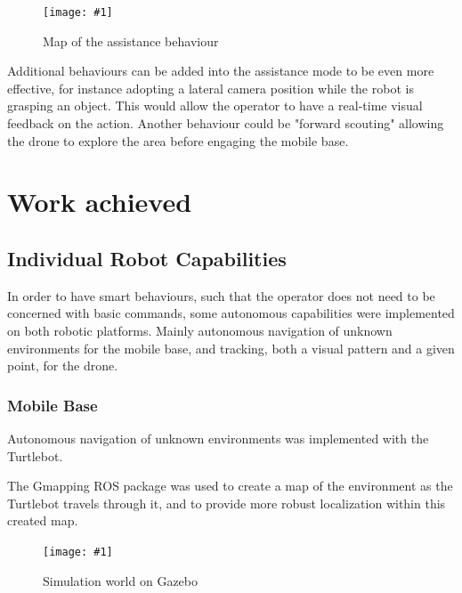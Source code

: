 \documentclass[11pt,a4paper]{article}
\newcommand{\centerFigure}[2]{
\begin{figure}[h]	
\centering
\texttt{[image: \#1]}
\caption{#2}
\end{figure}
}
\begin{document}
\centerFigure{assistanceBehavior.png}{Map of the assistance behaviour}

Additional behaviours can be added into the assistance mode to be even more effective, for
instance adopting a lateral camera position while the robot is grasping an object. This would
allow the operator to have a real-time visual feedback on the action. Another behaviour
could be "forward scouting" allowing the drone to explore the area before engaging the 
mobile base.

\section{Work achieved}

\subsection{Individual Robot Capabilities}
In order to have smart behaviours, such that the operator does not need to be concerned with basic commands, some autonomous capabilities were implemented on both robotic platforms. Mainly autonomous navigation of unknown environments for the mobile base, and tracking, both a visual pattern and a given point, for the drone.

\subsubsection{Mobile Base}
Autonomous navigation of unknown environments was implemented with the Turtlebot.

The Gmapping ROS package was used to create a map of the environment as the Turtlebot travels through it, and to provide more robust localization within this created map. 

\centerFigure{gazebo.png}{Simulation world on Gazebo}
\end{document}
